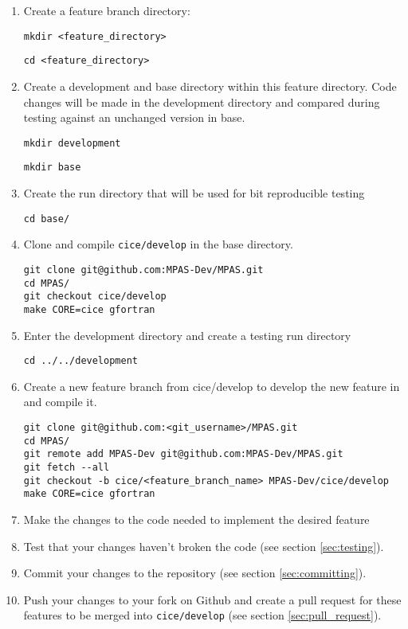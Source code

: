 \documentclass{article}
\begin{document}
\begin{enumerate}

\item Create a feature branch directory:

\verb+mkdir <feature_directory>+

\verb+cd <feature_directory>+

\item Create a development and base directory within this feature directory. Code changes will be made in the development directory and compared during testing against an unchanged version in base.

\verb+mkdir development+

\verb+mkdir base+

\item Create the run directory that will be used for bit reproducible testing

\verb+cd base/+

\item Clone and compile \verb+cice/develop+ in the base directory.
\begin{verbatim}
git clone git@github.com:MPAS-Dev/MPAS.git
cd MPAS/
git checkout cice/develop
make CORE=cice gfortran
\end{verbatim}

\item Enter the development directory and create a testing run directory

\verb+cd ../../development+



\item Create a new feature branch from cice/develop to develop the new feature in and compile it.
\begin{verbatim}
git clone git@github.com:<git_username>/MPAS.git
cd MPAS/
git remote add MPAS-Dev git@github.com:MPAS-Dev/MPAS.git
git fetch --all
git checkout -b cice/<feature_branch_name> MPAS-Dev/cice/develop
make CORE=cice gfortran
\end{verbatim}
 
\item Make the changes to the code needed to implement the desired feature

\item Test that your changes haven't broken the code (see section \ref{sec:testing}).

\item Commit your changes to the repository (see section \ref{sec:committing}).

\item Push your changes to your fork on Github and create a pull request for these features to be merged into \verb+cice/develop+ (see section \ref{sec:pull_request}).
  
\end{enumerate}
\end{document}
